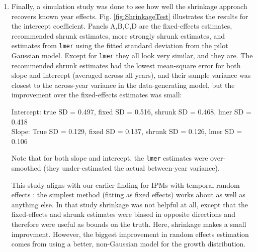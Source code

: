 \documentclass[11pt]{article}
\begin{document}
{\begin{enumerate}
\item Finally, a simulation study was done to see how well the shrinkage approach recovers known year effects. Fig. \ref{fig:ShrinkageTest}
illustrates the results for the intercept coefficient. Panels A,B,C,D are the fixed-effects estimates, recommended shrunk estimates,
more strongly shrunk estimates, and estimates from \texttt{lmer} using the fitted standard deviation from the pilot Gaussian model. 
Except for \texttt{lmer} they all look very similar, and they are. The recommended shrunk estimates had the lowest 
mean-square error for both slope and intercept (averaged across all years), and their sample variance was closest to the across-year 
variance in the data-generating model, but the improvement over the fixed-effects estimates was small: 

Intercept: true SD =  0.497, fixed SD =  0.516, shrunk SD = 0.468, lmer SD =  0.418 \\
Slope: True SD =  0.129, fixed SD = 0.137, shrunk SD = 0.126,  lmer SD = 0.106
 
Note that for both slope and intercept, the \texttt{lmer} estimates were over-smoothed (they under-estimated the
actual between-year variance). 

This study aligns with our earlier finding for IPMs with temporal random effects \citep{metcalf-etal-2015}: the simplest method (fitting as
fixed effects) works about as well as anything else. In that study shrinkage was not helpful at all, except that the fixed-effects 
and shrunk estimates were biased in opposite directions and therefore were useful as bounds on the truth. Here, shrinkage 
makes a small improvment. However, the biggest improvement in random effects estimation 
comes from using a better, non-Gaussian model for the growth distribution.  

\end{enumerate} 


\clearpage 

}
\end{document}
